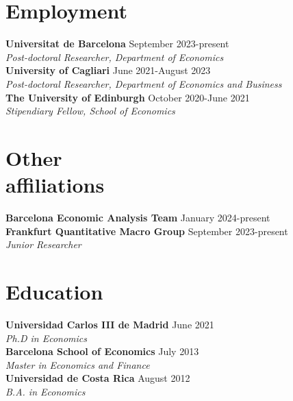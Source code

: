 \documentclass[margin]{res} %
\begin{document}
\begin{resume}

 
\section{Employment}
{\bf Universitat de Barcelona} \hfill September 2023-present  \\
{\sl Post-doctoral Researcher, Department of Economics} \\
{\bf University of Cagliari} \hfill June 2021-August 2023  \\
{\sl Post-doctoral Researcher, Department of Economics and Business} \\
{\bf The University of Edinburgh} \hfill October 2020-June 2021  \\
{\sl Stipendiary Fellow, School of Economics} 


\section{Other \\ affiliations}
{\bf Barcelona Economic Analysis Team} \hfill January 2024-present  \\

{\bf Frankfurt Quantitative Macro Group} \hfill September 2023-present  \\
{\sl Junior Researcher} 


\section{Education}
{\bf Universidad Carlos III de Madrid} \hfill June 2021  \\
{\sl Ph.D in Economics} \\
{\bf Barcelona School of Economics} \hfill July 2013 \\
{\sl Master in Economics and Finance}  \\
{\bf Universidad de Costa Rica} \hfill August 2012 \\
{\sl B.A. in Economics}


\end{resume}
\end{document}
